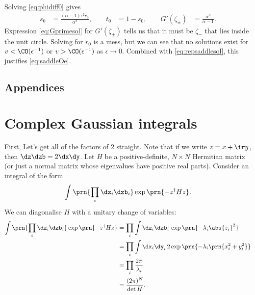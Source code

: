 \documentclass[12pt]{article}
\newcommand{\inv}{^{-1}}
\newcommand{\dg}{^\dagger}
\begin{document}
Solving \eqref{eq:phidiff0} gives
%
\begin{equation}\label{eq:repsaddlesol}
\begin{aligned}
  s_0 &= \frac{(\alpha-1)\epsilon^2r_0}{\alpha^2}, \qquad
  t_0 &= 1 - s_0,\qquad
  G'(\zeta_\pm) &= \frac{\alpha^3}{\alpha-1}.
\end{aligned}
\end{equation}
%
Expression \eqref{eq:Gprimesol} for $G'(\zeta_\pm)$ tells us that it must be $\zeta_-$ that lies inside the unit circle.
Solving for $r_0$ is a mess, but we can see that no solutions exist for $v<\CO(\epsilon\inv)$ or $v>\CO(\epsilon\inv)$ as $\epsilon\to0$.
Combined with \eqref{eq:repsaddlesol}, this justifies \eqref{eq:saddleOe}.




\subsection*{Appendices}%
\appendix

\section{Complex Gaussian integrals}\label{sec:compgauss}

First, Let's get all of the factors of 2 straight.
Note that if we write $z=x+\ir y$, then $\dz\dzb = 2\dx\dy$.
Let $H$ be a positive-definite, $N\times N$ Hermitian matrix
(or just a normal matrix whose eigenvalues have positive real parts).
Consider an integral  of the form
%
\begin{equation*}
  \int \prn{\prod_i\dz_i\dzb_i} \exp\prn{-z\dg H z}.
\end{equation*}
%
We can diagonalise $H$ with a unitary change of variables:
%
\begin{equation}\label{eq:compgausint}
\begin{aligned}
  \int \prn{\prod_i\dz_i\dzb_i} \exp\prn{-z\dg H z} &=
    \prod_i \int \dz_i\dzb_i\, \exp\prn{-\lambda_i \abs{z_i}^2} \\
    &= \prod_i \int \dx_i\dy_i\, 2\exp\prn{-\lambda_i \prn{x_i^2+y_i^2}} \\
    &= \prod_i \frac{2\pi}{\lambda_i}\\
    &= \frac{(2\pi)^N}{\det H}.
\end{aligned}
\end{equation}
%
\end{document}
